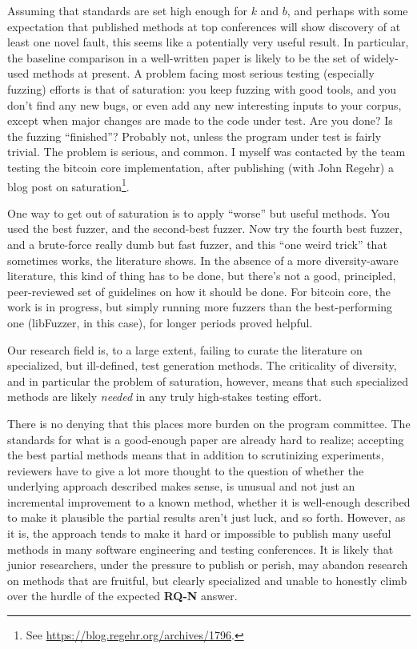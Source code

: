 \documentclass[sigplan]{acmart}
\begin{document}
Assuming that standards are set high enough for $k$ and $b$, and
perhaps with some expectation that published methods at top
conferences will show discovery of at least one novel fault, this
seems like a potentially very useful result.  In particular, the
baseline comparison in a well-written paper is likely to be the set of
widely-used methods at present.  A problem facing most serious testing
(especially fuzzing) efforts is that of saturation:  you keep fuzzing
with good tools, and you don't find any new bugs, or even add any new
interesting inputs to your corpus, except when major changes are made
to the code under test.  Are you done?  Is the fuzzing ``finished''?
Probably not, unless the program under test is fairly trivial.  The
problem is serious, and common.  I myself was contacted by the team
testing the bitcoin core implementation, after publishing (with John
Regehr) a blog post
on saturation\footnote{See
  \url{https://blog.regehr.org/archives/1796}.}.

One way to get out of saturation is to apply ``worse'' but useful
methods.  You used the best fuzzer, and the second-best fuzzer.  Now
try the fourth best fuzzer, and a brute-force really dumb but fast
fuzzer, and this ``one weird trick'' that sometimes works, the
literature shows.  In the absence of a more diversity-aware
literature, this kind of thing has to be done, but there's not a good,
principled, peer-reviewed set of guidelines on how it should be done.
For bitcoin core, the work is in progress, but simply running more
fuzzers than the best-performing one (libFuzzer, in this case), for
longer periods proved helpful.

Our research field is, to a large extent, failing to curate the
literature on specialized, but ill-defined, test generation methods.
The criticality of diversity, and in particular the problem of
saturation, however, means that such specialized methods are likely
\emph{needed} in any truly high-stakes testing effort.

There is no denying that this places more burden on the program
committee.  The standards for what is a good-enough paper are already
hard to realize; accepting the best partial methods means that in
addition to scrutinizing experiments, reviewers have to give a lot
more thought to the question of whether the underlying approach
described makes sense, is unusual and not just an incremental
improvement to a known method, whether it is well-enough described to
make it plausible the partial results aren't just luck, and so forth.
However, as it is, the approach tends to make it hard or impossible to
publish many useful methods in many software engineering and testing
conferences.  It is likely that junior researchers, under the pressure
to publish or perish, may abandon research on methods that are fruitful, but
clearly specialized and unable to honestly climb over the hurdle of
the expected {\bf RQ-N} answer.
\end{document}
